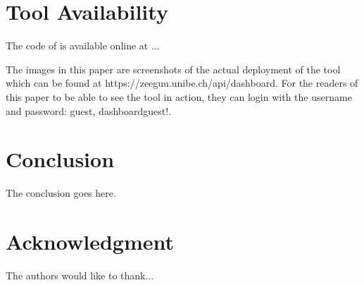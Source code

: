 \documentclass[conference]{IEEEtran}
\begin{document}
\section{Tool Availability}

The code of \tool is available online at ...

The images in this paper are screenshots of the actual deployment of the tool which can be found at {https://zeeguu.unibe.ch/api/dashboard}. For the readers of this paper to be able to see the tool in action, they can login with the username and password: guest, dashboardguest!. 

\section{Conclusion}
The conclusion goes here.






\section*{Acknowledgment}


The authors would like to thank...







%
%
%




\end{document}

